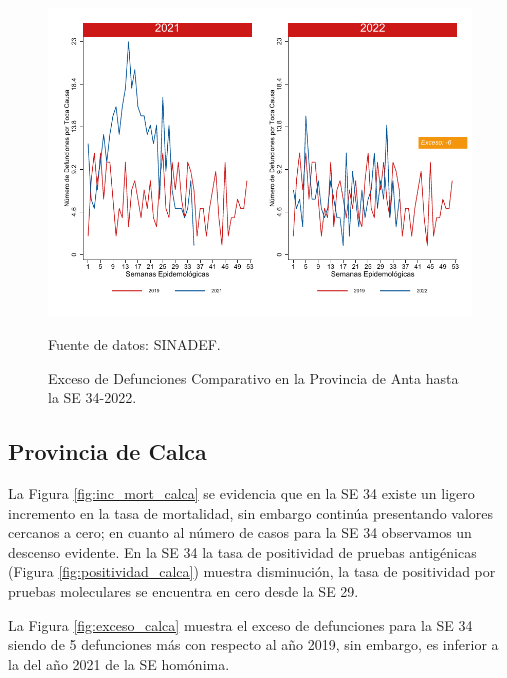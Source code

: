 \documentclass[12pt,a4paper,openany]{book}
\begin{document}
	\begin{figure}[h]
		\caption{Exceso de Defunciones Comparativo en la Provincia de Anta hasta la SE 34-2022.}\label{fig:exceso_anta}
		\begin{center}
			\includegraphics[width=0.7\linewidth]{../figuras/exceso_2.pdf}
		\end{center}
		{\footnotesize {Fuente de datos: SINADEF.}}
	\end{figure}
	
	\clearpage
	
	\subsection*{Provincia de Calca}
	\noindent La Figura \ref{fig:inc_mort_calca} se evidencia que en la SE 34 existe un ligero incremento en la tasa de mortalidad, sin embargo continúa presentando valores cercanos a cero; en cuanto al número de casos para la SE 34 observamos un descenso evidente. En la SE 34 la tasa de positividad de pruebas antigénicas (Figura \ref{fig:positividad_calca}) muestra disminución, la tasa de positividad por pruebas moleculares se encuentra en cero desde la SE 29.
	
	La Figura \ref{fig:exceso_calca} muestra el exceso de defunciones para la SE 34 siendo de 5 defunciones más con respecto al año 2019, sin embargo, es inferior a la del año 2021 de la SE homónima.
\end{document}

